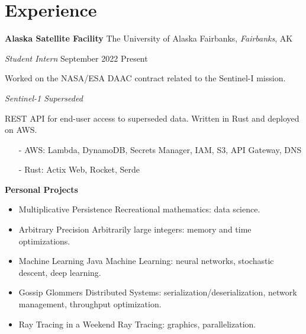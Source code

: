 ﻿\section{Experience}

\textbf{Alaska Satellite Facility}
\hfill
The University of Alaska Fairbanks, \textit{Fairbanks}, AK

\textit{Student Intern}
\hfill
{September 2022 \textendash Present}

\bigbreak

Worked on the NASA/ESA DAAC contract related to the Sentinel-I mission.

\bigbreak

\textit{Sentinel-1 Superseded}

REST API for end-user access to superseded data. Written in Rust and deployed on AWS.
\begin{itemize}\setlength\itemsep{-0.15cm}
    \item [-] AWS: Lambda, DynamoDB, Secrets Manager, IAM, S3, API Gateway, DNS
    \item [-] Rust: Actix Web, Rocket, Serde
\end{itemize}

\textbf{Personal Projects}

\begin{itemize}\setlength\itemsep{0cm}
    \item Multiplicative Persistence \textendash Recreational mathematics: data science.

    \item Arbitrary Precision \textendash Arbitrarily large integers: memory and time optimizations.
    
    \item Machine Learning Java \textendash Machine Learning: neural networks, stochastic descent, deep learning.

    \item Gossip Glommers \textendash Distributed Systems: serialization/deserialization, network management, throughput optimization.

    \item Ray Tracing in a Weekend \textendash Ray Tracing: graphics, parallelization.
\end{itemize}